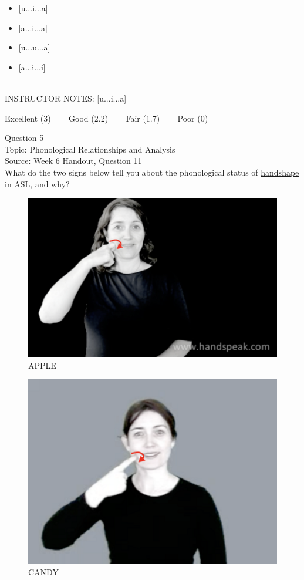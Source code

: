 \documentclass[12pt]{article}
\begin{document}
\begin{itemize} \item {[u...i...a]} \item {[a...i...a]} \item {[u...u...a]} \item {[a...i...i]} \end{itemize}


~\\
INSTRUCTOR NOTES: [u...i...a]


\vfill
Excellent (3) ~~~ Good (2.2) ~~~ Fair (1.7) ~~~ Poor (0)
\newpage

{\large Question 5}\\

Topic: Phonological Relationships and Analysis\\
Source: Week 6 Handout, Question 11\\

What do the two signs below tell you about the phonological status of \underline{handshape} in ASL, and why?\\

\begin{figure}[H]
\includegraphics{../images/asl_apple.png}
\caption{APPLE}
\end{figure}
\begin{figure}[H]
\includegraphics{../images/asl_candy.png}
\caption{CANDY}
\end{figure}
\end{document}
